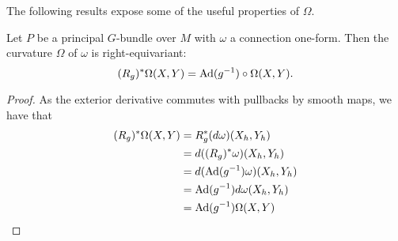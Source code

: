 The following results expose some of the useful properties of $\Omega$.

\begin{lem}
Let $P$ be a principal $G$-bundle over $M$ with $\omega$ a connection one-form. Then the curvature $\Omega$ of $\omega$ is right-equivariant:
\[(R_g)^*\Omega(X,Y)=\operatorname{Ad}(g^{-1})\circ \Omega(X,Y).\]
\end{lem}
\begin{proof}
As the exterior derivative commutes with pullbacks by smooth maps, we have that
\begin{align*}
(R_g)^*\Omega(X,Y)&=R_g^*(d\omega)(X_h,Y_h)\\
&=d((R_g)^*\omega)(X_h,Y_h)\\
&=d(\operatorname{Ad}(g^{-1})\omega)(X_h,Y_h)\\
&=\operatorname{Ad}(g^{-1})d\omega(X_h,Y_h)\\
&=\operatorname{Ad}(g^{-1})\Omega(X,Y)
\end{align*}
\end{proof}

